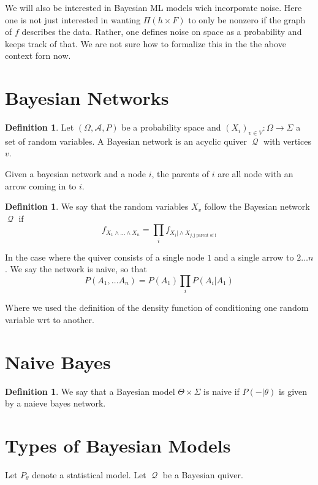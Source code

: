 \documentclass{book}
\theoremstyle{plain}
\theoremstyle{definition}
\newtheorem{definition}[corollary]{Definition}
\newcommand{\mor}{\longrightarrow}
\renewcommand{\r}[1]{\mathcal{#1}}
\renewcommand{\r}[1]{\mathcal{#1}}
\DeclareMathOperator{\Qvr}{\mathcal{Q}}
\begin{document}
We will also be interested in Bayesian ML models wich incorporate noise. Here one is not just interested in wanting $\Pi(h\times F)$ to only be nonzero if the graph of $f$ describes the data. Rather, one defines noise on space as a probability and keeps track of that. We are not sure how to formalize this in the the above context forn now.

\section{Bayesian Networks}

\begin{definition}
Let $(\Omega,\r{A},P)$ be a probability space and $(X_i)_{v \in V}: \Omega\mor \Sigma$ a set of random variables.
A Bayesian network is an acyclic	 quiver  $\Qvr$ with vertices $v$.\\
\end{definition}
Given a bayesian network and a node $i$, the parents of $i$ are all node with an arrow coming in to $i$.

\begin{definition}
We say that the random variables $X_v$ follow the Bayesian network $\Qvr$ if
\[
f_{X_1\wedge \ldots \wedge X_n}=\prod_i f_{X_i \vert \wedge X_{j, \textrm{j parent of i}}}\]
\end{definition}
In the case where the quiver consists of a single node $1$ and a single arrow to $2\ldots n$. We say the network is naive, so that
\[
P(A_1,\ldots A_n)=P(A_1)\prod_i P(A_i\vert A_1)
\]

Where we used the definition of the density function of conditioning one random variable wrt to another.
\section{Naive Bayes}

\begin{definition}
We say that a Bayesian model $\Theta \times \Sigma$ 	is naive if $P(-\vert \theta)$ is given by a naieve bayes network.
\end{definition}



\section{Types of Bayesian Models}

Let $P_\theta$ denote a statistical model. Let $\Qvr$ be a Bayesian quiver.
\end{document}
